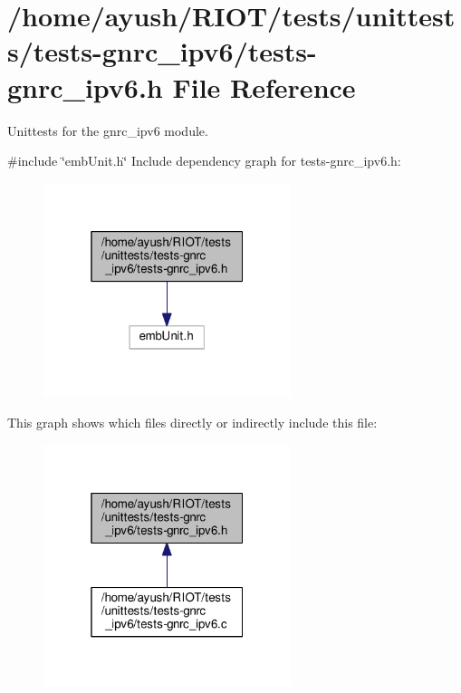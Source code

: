 \hypertarget{tests-gnrc__ipv6_8h}{}\section{/home/ayush/\+R\+I\+O\+T/tests/unittests/tests-\/gnrc\+\_\+ipv6/tests-\/gnrc\+\_\+ipv6.h File Reference}
\label{tests-gnrc__ipv6_8h}


Unittests for the {\ttfamily gnrc\+\_\+ipv6} module.  


{\ttfamily \#include \char`\"{}emb\+Unit.\+h\char`\"{}}\newline
Include dependency graph for tests-\/gnrc\+\_\+ipv6.h\+:
\nopagebreak
\begin{figure}[H]
\begin{center}
\leavevmode
\includegraphics[width=205pt]{tests-gnrc__ipv6_8h__incl}
\end{center}
\end{figure}
This graph shows which files directly or indirectly include this file\+:
\nopagebreak
\begin{figure}[H]
\begin{center}
\leavevmode
\includegraphics[width=205pt]{tests-gnrc__ipv6_8h__dep__incl}
\end{center}
\end{figure}
